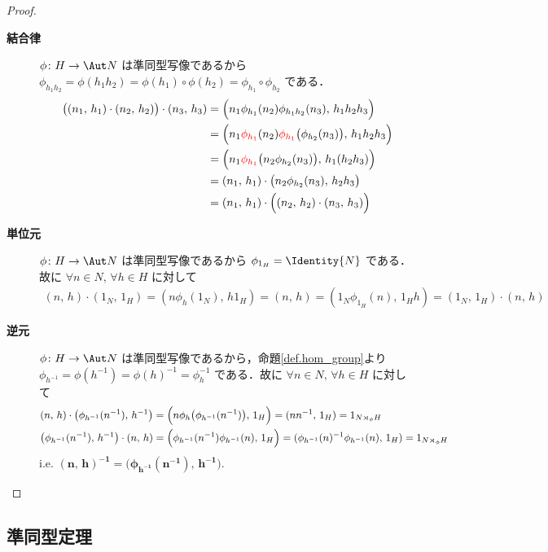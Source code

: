 \documentclass[geometry_main]{subfiles}
\begin{document}
\begin{proof}
	\begin{description}
		\item[\textbf{結合律}] $\phi\colon H \to \Aut N$ は準同型写像であるから $\phi_{h_1h_2} = \phi(h_1h_2) = \phi(h_1) \circ \phi(h_2) = \phi_{h_1} \circ \phi_{h_2}$ である．
		\begin{align}
			\bigl((n_1,\, h_1) \cdot (n_2,\, h_2)\bigr) \cdot (n_3,\, h_3) &= \Bigl( n_1 \phi_{h_1}(n_2)  \phi_{h_1h_2}(n_3),\, h_1h_2h_3 \Bigr) \\
			&= \Bigl( n_1 \textcolor{red}{\phi_{h_1}}(n_2)  \textcolor{red}{\phi_{h_1}}\bigl(\phi_{h_2}(n_3)\bigr),\, h_1h_2h_3 \Bigr) \\
			&= \Bigl( n_1 \textcolor{red}{\phi_{h_1}}\bigl(n_2\phi_{h_2}(n_3)\bigr),\, h_1(h_2h_3) \Bigr) \\
			&= (n_1,\, h_1) \cdot \bigl( n_2\phi_{h_2}(n_3),\, h_2h_3 \bigr) \\
			&= (n_1,\, h_1) \cdot \Bigl( (n_2,\, h_2) \cdot (n_3,\, h_3) \Bigr) 
		\end{align}
		\item[\textbf{単位元}] $\phi\colon H \to \Aut N$ は準同型写像であるから $\phi_{1_H} = \Identity{N}$ である．故に $\forall n \in N,\, \forall h \in H$ に対して
		\begin{align}
			(n,\, h) \cdot (1_N,\, 1_H) = (n\phi_h(1_N),\, h1_H) = (n,\, h) = (1_N \phi_{1_H}(n),\, 1_H h) = (1_N,\, 1_H) \cdot (n,\, h)
		\end{align}
		\item[\textbf{逆元}]  $\phi\colon H \to \Aut N$ は準同型写像であるから，命題\ref{def.hom_group}より $\phi_{h^{-1}} = \phi(h^{-1}) = \phi(h)^{-1} = \phi_{h}^{-1}$ である．故に $\forall n \in N,\, \forall h \in H$ に対して
		\begin{align}
			(n,\, h) \cdot \bigl(\phi_{h^{-1}}(n^{-1}),\, h^{-1}\bigr) &= \Bigl(n\phi_h\bigl(\phi_{h^{-1}}(n^{-1})\bigr),\, 1_H\Bigr) = (nn^{-1},\, 1_H) = 1_{N \rtimes_\phi H} \\
			\bigl(\phi_{h^{-1}}(n^{-1}),\, h^{-1}\bigr)\cdot (n,\, h) &= \Bigl(\phi_{h^{-1}}(n^{-1}) \phi_{h^{-1}}(n),\, 1_H\Bigr) = (\phi_{h^{-1}}(n)^{-1}\phi_{h^{-1}}(n),\, 1_H) = 1_{N \rtimes_\phi H}
		\end{align}
		i.e. $\bm{(n,\, h)^{-1} = \bigl(\phi_{h^{-1}}(n^{-1}),\, h^{-1}\bigr)}.$ 
	\end{description}
\end{proof}


\subsection{準同型定理}
\end{document}
